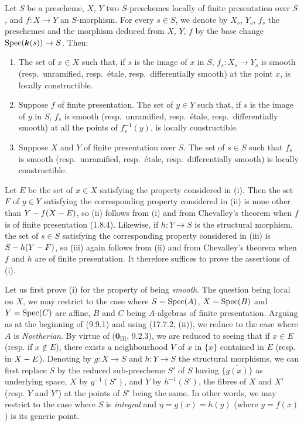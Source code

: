 \begin{proposition}[17.7.11]
\label{IV.17.7.11}
Let $S$ be a prescheme, $X$, $Y$ two $S$-preschemes locally of finite presentation over $S$, and $f:X\to Y$ an $S$-morphism. For every $s\in S$, we denote by $X_s$, $Y_s$, $f_s$ the preschemes and the morphism deduced from $X$, $Y$, $f$ by the base change $\operatorname{Spec}(\boldsymbol{k}(s))\to S$. Then:
\begin{enumerate}
  \item[\textup{(i)}] The set of $x\in X$ such that, if $s$ is the image of $x$ in $S$, $f_s:X_s\to Y_s$ is smooth \textup{(resp.}\ unramified, \textup{resp.}\ étale, \textup{resp.}\ differentially smooth\textup{)} at the point $x$, is locally constructible.
  \item[\textup{(ii)}] Suppose $f$ of finite presentation. The set of $y\in Y$ such that, if $s$ is the image of $y$ in $S$, $f_s$ is smooth \textup{(resp.}\ unramified, \textup{resp.}\ étale, \textup{resp.}\ differentially smooth\textup{)} at all the points of $f_s^{-1}(y)$, is locally constructible.
  \item[\textup{(iii)}] Suppose $X$ and $Y$ of finite presentation over $S$. The set of $s\in S$ such that $f_s$ is smooth \textup{(resp.}\ unramified, \textup{resp.}\ étale, \textup{resp.}\ differentially smooth\textup{)} is locally constructible.
\end{enumerate}
\end{proposition}

Let $E$ be the set of $x\in X$ satisfying the property considered in (i). Then the set $F$ of $y\in Y$ satisfying the corresponding property considered in (ii) is
none other than $Y- f(X- E)$, so (ii) follows from (i) and from Chevalley's theorem when $f$ is of finite presentation (1.8.4). Likewise, if $h:Y\to S$ is the structural morphism, the set of $s\in S$ satisfying the corresponding property considered in (iii) is $S- h(Y- F)$, so (iii) again follows from (ii) and from Chevalley's theorem when $f$ and $h$ are of finite presentation. It therefore suffices to prove the assertions of (i).

Let us first prove (i) for the property of being \emph{smooth}. The question being local on $X$, we may restrict to the case where $S=\operatorname{Spec}(A)$, $X=\operatorname{Spec}(B)$ and $Y=\operatorname{Spec}(C)$ are affine, $B$ and $C$ being $A$-algebras of finite presentation. Arguing as at the beginning of (9.9.1) and using (17.7.2, (ii)), we reduce to the case where $A$ is \emph{Noetherian}. By virtue of ($\mathbf{0}_{\mathrm{III}}$, 9.2.3), we are reduced to seeing that if $x\in E$ (resp. if $x\notin E$), there exists a neighbourhood $V$ of $x$ in $\overline{\{x\}}$ contained in $E$ (resp. in $X- E$). Denoting by $g:X\to S$ and $h:Y\to S$ the structural morphisms, we can first replace $S$ by the reduced sub-prescheme $S'$ of $S$ having $\overline{\{g(x)\}}$ as underlying space, $X$ by $g^{-1}(S')$, and $Y$ by $h^{-1}(S')$, the fibres of $X$ and $X'$ (resp. $Y$ and $Y'$) at the points of $S'$ being the same. In other words, we may restrict to the case where $S$ is \emph{integral} and $\eta=g(x)=h(y)$ (where $y=f(x)$) is its generic point.

